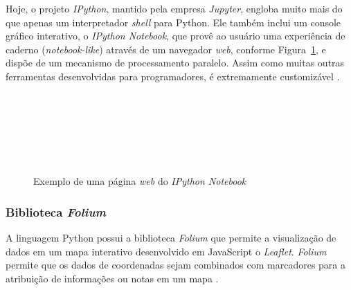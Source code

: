 Hoje, o projeto \textit{IPython}, mantido pela empresa \textit{Jupyter}, engloba muito mais do que apenas um interpretador \textit{shell} para Python. Ele também inclui um console gráfico interativo, o \textit{IPython Notebook}, que provê ao usuário uma experiência de caderno (\textit{notebook-like}) através de um navegador \textit{web}, conforme Figura~\ref{ipython-fig}, e dispõe de um mecanismo de processamento paralelo. Assim como muitas outras ferramentas desenvolvidas para programadores, é extremamente customizável \cite{mining-social-web}. \\ \\ \\ \\ \\ \\ \\

\begin{figure}[h!]
  \centering
  \caption{Exemplo de uma página \textit{web} do \textit{IPython Notebook}}
  \vspace{-0.3cm}
  \label{ipython-fig}
\end{figure}

\subsubsection{Biblioteca \textit{Folium}}
A linguagem Python possui a biblioteca \textit{Folium} que permite a visualização de dados em um mapa interativo desenvolvido em JavaScript o \textit{Leaflet}. \textit{Folium} permite que os dados de coordenadas sejam combinados com marcadores para a atribuição de informações ou notas em um mapa \cite{folium}.

